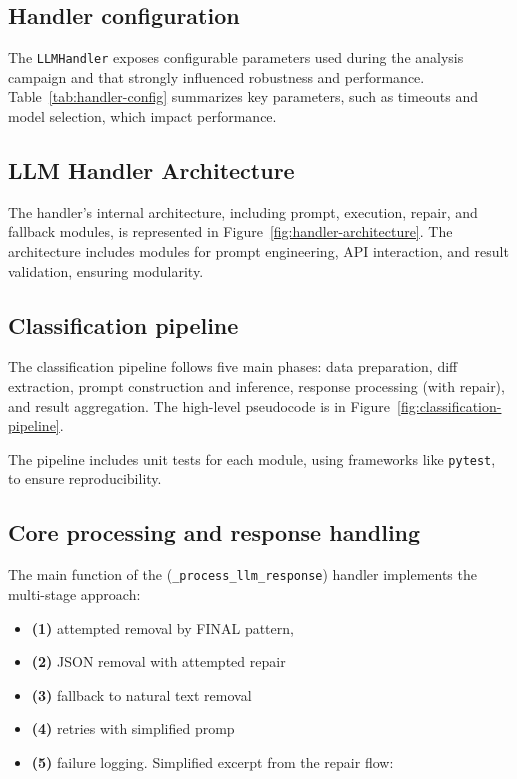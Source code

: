 \subsection{Handler configuration}
The \texttt{LLMHandler} exposes configurable parameters used during the analysis campaign and that strongly influenced robustness and performance. Table~\ref{tab:handler-config} summarizes key parameters, such as timeouts and model selection, which impact performance.


\subsection{LLM Handler Architecture}
The handler's internal architecture, including prompt, execution, repair, and fallback modules, is represented in Figure~\ref{fig:handler-architecture}. The architecture includes modules for prompt engineering, API interaction, and result validation, ensuring modularity.


\subsection{Classification pipeline}
The classification pipeline follows five main phases: data preparation,
diff extraction, prompt construction and inference, response processing
(with repair), and result aggregation. The high-level pseudocode is in
Figure~\ref{fig:classification-pipeline}.


The pipeline includes unit tests for each module, using frameworks like \texttt{pytest}, to ensure reproducibility.

\subsection{Core processing and response handling}

The main function of the (\texttt{\_process\_llm\_response}) handler implements the multi-stage approach: 

\begin{itemize}
  \item \textbf{(1)} attempted removal by FINAL pattern,
  \item \textbf{(2)} JSON removal with attempted repair
  \item \textbf{(3)} fallback to natural text removal
  \item \textbf{(4)} retries with simplified promp
  \item \textbf{(5)} failure logging. Simplified excerpt from the repair flow:
\end{itemize}


